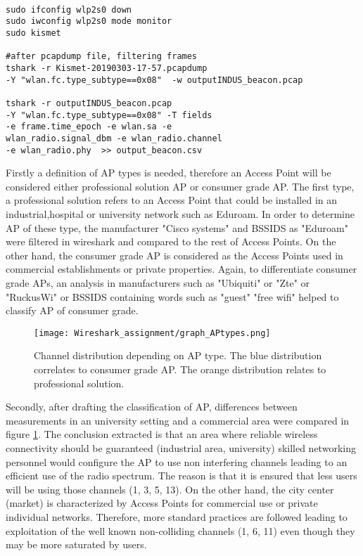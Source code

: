 \documentclass[conference]{IEEEtran}
\begin{document}
\begin{lstlisting}

sudo ifconfig wlp2s0 down
sudo iwconfig wlp2s0 mode monitor
sudo kismet

#after pcapdump file, filtering frames
tshark -r Kismet-20190303-17-57.pcapdump
-Y "wlan.fc.type_subtype==0x08"  -w outputINDUS_beacon.pcap

tshark -r outputINDUS_beacon.pcap 
-Y "wlan.fc.type_subtype==0x08" -T fields 
-e frame.time_epoch -e wlan.sa -e 
wlan_radio.signal_dbm -e wlan_radio.channel 
-e wlan_radio.phy  >> output_beacon.csv
\end{lstlisting}

Firstly a definition of AP types is needed, therefore an Access Point will be considered either professional solution AP or consumer grade AP. The first type, a professional solution refers to an Access Point that could be installed in an industrial,hospital or university network such as Eduroam. In order to determine AP of these type, the manufacturer "Cisco systems" and BSSIDS as "Eduroam" were filtered in wireshark and compared to the rest of Access Points. On the other hand, the consumer grade AP is considered as the Access Points used in commercial establishments or private properties. Again, to differentiate consumer grade APs, an analysis in manufacturers such as "Ubiquiti" or "Zte" or "RuckusWi" or BSSIDS containing words such as "guest" "free wifi" helped to classify AP of consumer grade.

\begin{figure}[ht]
    \centering
    \texttt{[image: Wireshark\_assignment/graph\_APtypes.png]}
    \caption{Channel distribution depending on AP type. The blue distribution correlates to consumer grade AP. The orange distribution relates to professional solution.}
   \label{fig:graph_APtypes}
\end{figure}

Secondly, after drafting the classification of AP, differences between measurements in an university setting and a commercial area were compared in figure \ref{fig:graph_APtypes}. The conclusion extracted is that an area where reliable wireless connectivity should be guaranteed (industrial area, university) skilled networking personnel would configure the AP to use non interfering channels leading to an efficient use of the radio spectrum. The reason is that it is ensured that less users will be using those channels (1, 3, 5, 13). On the other hand, the city center (market) is characterized by Access Points for commercial use or private individual networks. Therefore, more standard practices are followed leading to exploitation of the well known non-colliding channels (1, 6, 11) even though they may be more saturated by users. 
\end{document}
